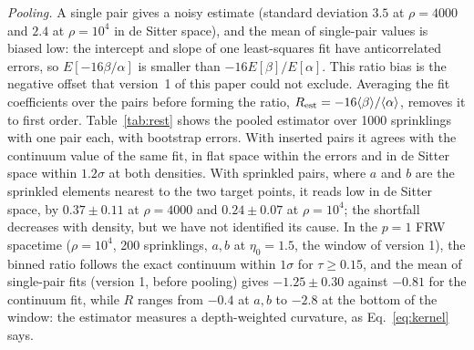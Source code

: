\documentclass[prd,twocolumn,superscriptaddress,nofootinbib,amsmath,amssymb,floatfix]{revtex4-2}
\begin{document}
\emph{Pooling.} A single pair gives a noisy estimate (standard deviation $3.5$ at $\rho=4000$ and $2.4$ at $\rho=10^4$ in de Sitter space), and the mean of single-pair values is biased low: the intercept and slope of one least-squares fit have anticorrelated errors, so $E[-16\beta/\alpha]$ is smaller than $-16E[\beta]/E[\alpha]$. This ratio bias is the negative offset that version~1 of this paper could not exclude. Averaging the fit coefficients over the pairs before forming the ratio, $R_{\rm est}=-16\langle\beta\rangle/\langle\alpha\rangle$, removes it to first order. Table~\ref{tab:rest} shows the pooled estimator over 1000 sprinklings with one pair each, with bootstrap errors. With inserted pairs it agrees with the continuum value of the same fit, in flat space within the errors and in de Sitter space within $1.2\sigma$ at both densities. With sprinkled pairs, where $a$ and $b$ are the sprinkled elements nearest to the two target points, it reads low in de Sitter space, by $0.37\pm0.11$ at $\rho=4000$ and $0.24\pm0.07$ at $\rho=10^4$; the shortfall decreases with density, but we have not identified its cause. In the $p=1$ FRW spacetime ($\rho=10^4$, 200 sprinklings, $a,b$ at $\eta_0=1.5$, the window of version 1), the binned ratio follows the exact continuum within $1\sigma$ for $\tau\geq0.15$, and the mean of single-pair fits (version 1, before pooling) gives $-1.25\pm0.30$ against $-0.81$ for the continuum fit, while $R$ ranges from $-0.4$ at $a,b$ to $-2.8$ at the bottom of the window: the estimator measures a depth-weighted curvature, as Eq.~\eqref{eq:kernel} says.
\end{document}
